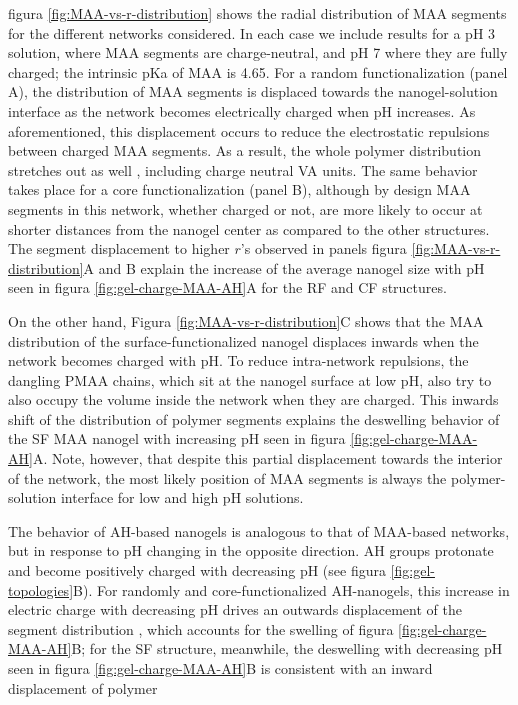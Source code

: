 figura \ref{fig:MAA-vs-r-distribution} shows the radial distribution of MAA segments for the different networks considered.
In each case we include results for a pH 3 solution, where MAA segments are charge-neutral, and  pH  7  where they are fully charged;
the intrinsic pKa of MAA is 4.65.
For a random functionalization (panel A), the distribution of MAA segments is displaced towards the nanogel-solution interface as the network becomes electrically charged when pH increases.
As aforementioned, this displacement occurs to reduce  the electrostatic repulsions between charged MAA segments.
As a result, the whole polymer distribution stretches out as well %
, including charge neutral VA units.
The same behavior takes place for a core functionalization (panel B),
although by design MAA segments in this network, whether charged or not, are more likely to occur at shorter distances from the nanogel center as compared to the other structures.
The segment displacement to higher $r$'s observed in panels figura  \ref{fig:MAA-vs-r-distribution}A and B  explain the increase of the average nanogel size with pH  seen in  figura \ref{fig:gel-charge-MAA-AH}A for the RF and CF structures.


On the other hand, 
Figura \ref{fig:MAA-vs-r-distribution}C shows that the MAA distribution of the surface-functionalized nanogel  displaces inwards when the network becomes charged with pH.
To reduce intra-network repulsions, the dangling PMAA chains, which sit at the nanogel surface at low pH, also try to also occupy the volume inside the network when they are charged.
This  inwards shift of the distribution of polymer segments %
explains the deswelling behavior of the SF MAA nanogel with increasing pH seen in  figura \ref{fig:gel-charge-MAA-AH}A.
Note, however, that despite this partial displacement towards the interior of the network, the most likely position of MAA segments is always the polymer-solution interface for low and high pH solutions.



The behavior of AH-based nanogels is analogous to that of MAA-based networks, but in response to  pH changing in the opposite direction.
AH groups protonate and become positively charged with decreasing pH (see figura  \ref{fig:gel-topologies}B).
For randomly and core-functionalized AH-nanogels, this increase in electric charge with decreasing pH drives an outwards displacement of the segment distribution %
, which accounts for the swelling of figura \ref{fig:gel-charge-MAA-AH}B;
for the SF structure, meanwhile,  the deswelling with decreasing pH seen in figura \ref{fig:gel-charge-MAA-AH}B is consistent with an inward displacement of polymer %











